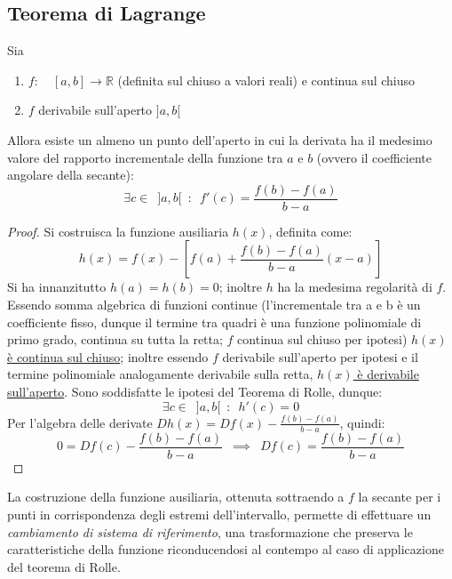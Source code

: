 \documentclass[10pt]{article}
\theoremstyle{plain}
\begin{document}
\subsection{Teorema di Lagrange}
\begin{ther}[\textbf{T. di L.}]
Sia \begin{enumerate}
    \item $f: \enspace \enspace [a, b] \rightarrow \mathbb{R}$ (definita sul chiuso a valori reali) e continua sul chiuso
    \item $f$ derivabile sull'aperto $]a, b[$
\end{enumerate}
Allora esiste un almeno un punto dell'aperto in cui la derivata ha il medesimo valore del rapporto incrementale della funzione tra $a$ e $b$ (ovvero il coefficiente angolare della secante):
\[\exists c \in \enspace ]a, b[ \enspace : \enspace f'(c) = \frac{f(b) - f(a)}{b - a}\]
\end{ther}
\begin{proof}
Si costruisca la funzione ausiliaria $h(x)$, definita come:
\[h(x) = f(x) - [f(a) + \frac{f(b) - f(a)}{b - a}(x - a)]\]
Si ha innanzitutto $h(a) = h(b) = 0$; inoltre $h$ ha la medesima regolarità di $f$. Essendo somma algebrica di funzioni continue (l'incrementale tra a e b è un coefficiente fisso, dunque il termine tra quadri è una funzione polinomiale di primo grado, continua su tutta la retta; $f$ continua sul chiuso per ipotesi) \underline{$h(x)$ è continua sul chiuso}; inoltre essendo $f$ derivabile sull'aperto per ipotesi e il termine polinomiale analogamente derivabile sulla retta, \underline{$h(x)$ è derivabile sull'aperto}. Sono soddisfatte le ipotesi del Teorema di Rolle, dunque:
\[\exists c \in \enspace]a, b[\enspace : \enspace h'(c) = 0\]
Per l'algebra delle derivate $D h(x) = D f (x) - \frac{f(b) - f(a)}{b - a}$, quindi:
\[0 = D f (c) - \frac{f(b) - f(a)}{b - a} \enspace \implies \enspace D f (c) = \frac{f(b) - f(a)}{b - a}\]
\end{proof}
\begin{oss}
La costruzione della funzione ausiliaria, ottenuta sottraendo a $f$ la secante per i punti in corrispondenza degli estremi dell'intervallo, permette di effettuare un \textit{cambiamento di sistema di riferimento}, una trasformazione che preserva le caratteristiche della funzione riconducendosi al contempo al caso di applicazione del teorema di Rolle.
\end{oss}
\end{document}

